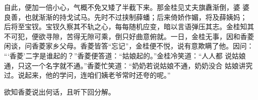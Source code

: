 自此，便加一倍小心，气概不免又矮了半截下来。那金桂见丈夫旗纛渐倒，婆
婆良善，也就渐渐的持戈试马。先时不过挟制薛蟠；后来倚娇作媚，将及薛姨妈；
后将至宝钗。宝钗久察其不轨之心，每每随机应变，暗以言语弹压其志。金桂知其
不可犯，便欲寻隙，苦得无隙可乘，倒只好曲意俯就。一日，金桂无事，因和香菱
闲谈，问香菱家乡父母。香菱皆答“忘记”，金桂便不悦，说有意欺瞒了他。因问：
“‘香菱’二字是谁起的？”香菱便答道：“姑娘起的。”金桂冷笑道：“人人都
说姑娘通，只这一个名字就不通。”香菱忙笑道：“奶奶若说姑娘不通，奶奶没合
姑娘讲究过。说起来，他的学问，连咱们姨老爷常时还夸的呢。”

欲知香菱说出何话，且听下回分解。